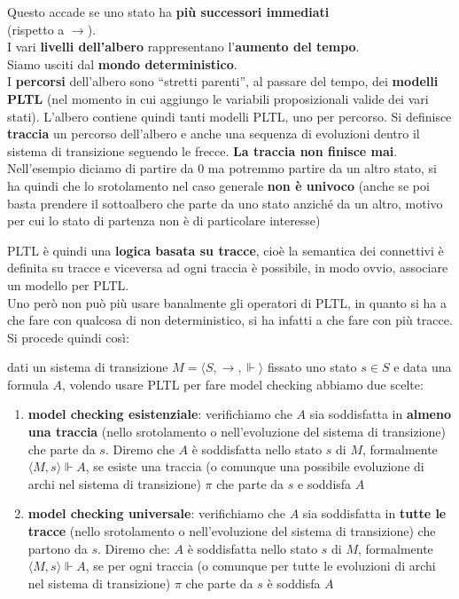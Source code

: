 \documentclass[a4paper,12pt, oneside]{book}
\begin{document}
\begin{definizione}
\begin{figure}[H]
  \end{figure}
  Questo accade se uno stato ha \textbf{più successori immediati} \\
  (rispetto a $\to$).\\
  I vari \textbf{livelli dell'albero} rappresentano l'\textbf{aumento del
    tempo}.\\
  Siamo usciti dal \textbf{mondo deterministico}.\\
  I \textbf{percorsi} dell'albero sono ``stretti parenti'', al passare del
  tempo, dei \textbf{modelli PLTL} (nel momento in cui aggiungo le variabili
  proposizionali valide dei vari stati). L'albero contiene quindi tanti modelli
  PLTL, uno per percorso. Si definisce \textbf{traccia} un percorso dell'albero
  e anche una sequenza di evoluzioni dentro il sistema di transizione seguendo
  le frecce.\textbf{ La traccia non finisce mai}.\\
  Nell'esempio diciamo di partire da 0 ma potremmo partire da un altro stato, si
  ha quindi che lo srotolamento nel caso generale \textbf{non è univoco} (anche
  se poi basta prendere il sottoalbero che parte da uno stato anziché da un
  altro, motivo per cui lo stato di partenza non è di particolare interesse)
\end{definizione}
PLTL è quindi una \textbf{logica basata su tracce}, cioè la semantica dei
connettivi è definita su tracce e viceversa ad ogni traccia è possibile, 
in modo ovvio, associare un modello per PLTL.\\
Uno però non può più usare banalmente gli operatori di PLTL, in quanto si ha a
che fare con qualcosa di non deterministico, si ha infatti a che fare con più
tracce.\\
Si procede quindi così:
\begin{definizione}
  dati un sistema di transizione $M=\langle S,\to,\Vdash\rangle$ fissato uno stato
  $s\in S$ e data una formula $A$, volendo usare PLTL per fare model checking
  abbiamo due scelte:
  \begin{enumerate}
    \item \textbf{model checking esistenziale}: verifichiamo che $A$ sia
    soddisfatta in \textbf{almeno una traccia} (nello srotolamento o
    nell'evoluzione del sistema di transizione) che parte da $s$.
    Diremo che $A$ è soddisfatta nello stato $s$ di $M$, formalmente $\langle
    M,s\rangle\Vdash A$, se esiste una traccia (o comunque una possibile
    evoluzione di archi nel sistema di transizione) $\pi$ che parte da $s$ e
    soddisfa $A$
    \item \textbf{model checking universale}: verifichiamo che $A$ sia
    soddisfatta in \textbf{tutte le tracce} (nello srotolamento o
    nell'evoluzione del sistema di transizione) che partono da $s$. Diremo che:
    $A$ è soddisfatta nello stato $s$ di $M$, formalmente $\langle
    M,s\rangle\Vdash A$, se per ogni traccia (o comunque per tutte le
    evoluzioni di archi nel sistema di transizione) $\pi$ che parte da $s$ è
    soddisfa $A$ 
  \end{enumerate}
\end{definizione}
\end{document}
